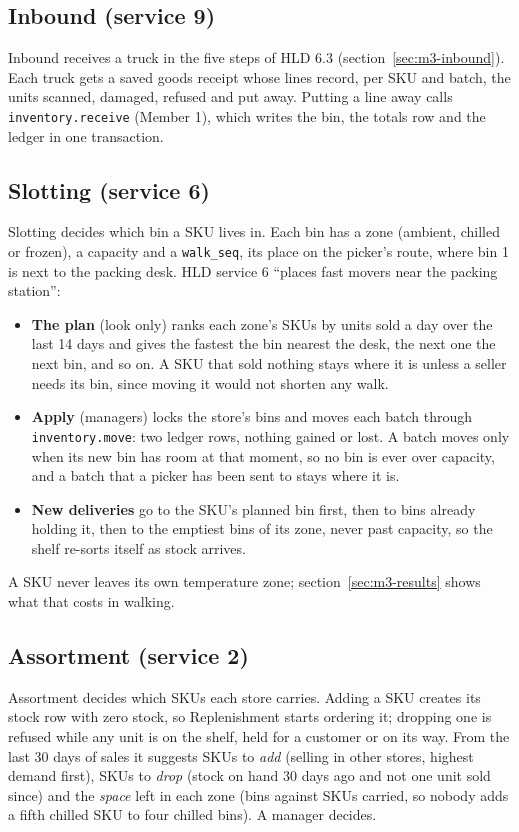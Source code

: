 \subsection{Inbound (service 9)}

Inbound receives a truck in the five steps of HLD 6.3 (section~\ref{sec:m3-inbound}). Each truck gets a saved goods
receipt whose lines record, per SKU and batch, the units scanned, damaged, refused and put away. Putting a line away
calls \texttt{inventory.receive} (Member 1), which writes the bin, the totals row and the ledger in one transaction.

\subsection{Slotting (service 6)}

Slotting decides which bin a SKU lives in. Each bin has a zone (ambient, chilled or frozen), a capacity and a
\texttt{walk\_seq}, its place on the picker's route, where bin 1 is next to the packing desk. HLD service 6 ``places
fast movers near the packing station'':
\begin{itemize}
  \item \textbf{The plan} (look only) ranks each zone's SKUs by units sold a day over the last 14 days and gives the
    fastest the bin nearest the desk, the next one the next bin, and so on. A SKU that sold nothing stays where it is
    unless a seller needs its bin, since moving it would not shorten any walk.
  \item \textbf{Apply} (managers) locks the store's bins and moves each batch through \texttt{inventory.move}: two
    ledger rows, nothing gained or lost. A batch moves only when its new bin has room at that moment, so no bin is ever
    over capacity, and a batch that a picker has been sent to stays where it is.
  \item \textbf{New deliveries} go to the SKU's planned bin first, then to bins already holding it, then to the
    emptiest bins of its zone, never past capacity, so the shelf re-sorts itself as stock arrives.
\end{itemize}
A SKU never leaves its own temperature zone; section~\ref{sec:m3-results} shows what that costs in walking.

\subsection{Assortment (service 2)}

Assortment decides which SKUs each store carries. Adding a SKU creates its stock row with zero stock, so
Replenishment starts ordering it; dropping one is refused while any unit is on the shelf, held for a customer or on its
way. From the last 30 days of sales it suggests SKUs to \emph{add} (selling in other stores, highest demand first),
SKUs to \emph{drop} (stock on hand 30 days ago and not one unit sold since) and the \emph{space} left in each zone
(bins against SKUs carried, so nobody adds a fifth chilled SKU to four chilled bins). A manager decides.

